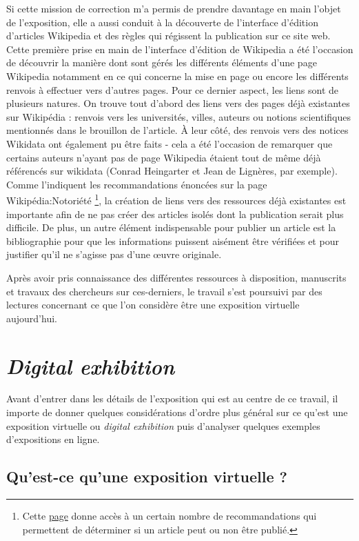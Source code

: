 	Si cette mission de correction m'a permis de prendre davantage en main l'objet de l'exposition, elle a aussi conduit à la découverte de l'interface d'édition d'articles Wikipedia et des règles qui régissent la publication sur ce site web. Cette première prise en main de l’interface d’édition de Wikipedia a été l’occasion de découvrir la manière dont sont gérés les différents éléments d’une page Wikipedia notamment en ce qui concerne la mise en page ou encore les différents renvois à effectuer vers d’autres pages. Pour ce dernier aspect, les liens sont de plusieurs natures. On trouve tout d’abord des liens vers des pages déjà existantes sur Wikipédia : renvois vers les universités, villes, auteurs ou notions scientifiques mentionnés dans le brouillon de l'article. À leur côté, des renvois vers des notices Wikidata ont également pu être faits - cela a été l’occasion de remarquer que certains auteurs n’ayant pas de page Wikipedia étaient tout de même déjà référencés sur wikidata (Conrad Heingarter et Jean de Lignères, par exemple). Comme l'indiquent les recommandations énoncées sur la page Wikipédia:Notoriété \footnote{Cette \href{https://fr.wikipedia.org/wiki/Wikipédia:Notoriété}{page} donne accès à un certain nombre de recommandations qui permettent de déterminer si un article peut ou non être publié.}, la création de liens vers des ressources déjà existantes est importante afin de ne pas créer des articles isolés dont la publication serait plus difficile. De plus, un autre élément indispensable pour publier un article est la bibliographie pour que les informations puissent aisément être vérifiées et pour justifier qu'il ne s'agisse pas d'une œuvre originale. 
	
    Après avoir pris connaissance des différentes ressources à disposition, manuscrits et travaux des chercheurs sur ces-derniers, le travail s'est poursuivi par des lectures concernant ce que l'on considère être une exposition virtuelle aujourd'hui. 
	
	\chapter{\textit{Digital exhibition}}
	Avant d'entrer dans les détails de l'exposition qui est au centre de ce travail, il importe de donner quelques considérations d'ordre plus général sur ce qu'est une exposition virtuelle ou \textit{digital exhibition} puis d'analyser quelques exemples d'expositions en ligne. 
	
	\section{Qu’est-ce qu’une exposition virtuelle ?}

